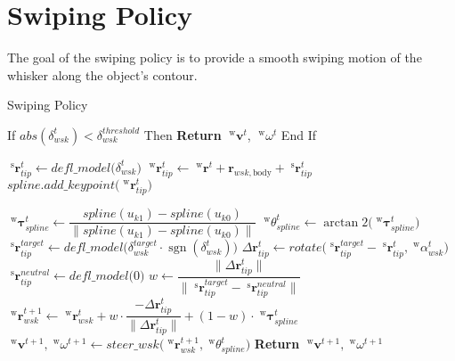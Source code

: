 \section{Swiping Policy}

The goal of the swiping policy is to provide a smooth swiping motion of the whisker along the object's contour.

\begin{algorithm}[htb]
    \caption{Swiping Policy}
    \begin{algorithmic}
        \State If \(abs(\delta_{wsk}^{t}) < \delta_{wsk}^{threshold}\)  Then
        \State \quad \textbf{Return} \(\;^{\mathrm{w}}\boldsymbol{v}^{t}\), \(\;^{\mathrm{w}}\omega^{t}\)
        \State End If

        \State \(\;^{\mathrm{s}}\boldsymbol{r}_{tip}^{t} \gets defl\_model\Big(\delta_{wsk}^{t}\Big)\)
        \State \(\;^{\mathrm{w}}\boldsymbol{r}_{tip}^{t} \gets \;^{\mathrm{w}}\boldsymbol{r}^{t} + \boldsymbol{r}_{wsk, \textrm{body}} + \;^{\mathrm{s}}\boldsymbol{r}_{tip}^{t}\)
        \State \(spline.add\_keypoint\big(\;^{\mathrm{w}}\boldsymbol{r}_{tip}^{t}\big)\) 

        \State \(\;^{\mathrm{w}}\boldsymbol{\tau}_{spline}^{t} \gets \dfrac{spline(u_{k1}) - spline(u_{k0})}{\|spline(u_{k1}) - spline(u_{k0})\|}\) 
        \State \(\;^{\mathrm{w}}\theta_{spline}^{t} \gets \arctan2\Big(\;^{\mathrm{w}}\boldsymbol{\tau}_{spline}^{t}\Big)\) 
        \State \(\;^{\mathrm{s}}\boldsymbol{r}_{tip}^{target} \gets defl\_model\Big(\delta_{wsk}^{target} \cdot \operatorname{sgn}(\delta_{wsk}^{t})\Big)\) 
        \State \(\Delta\boldsymbol{r}_{tip}^{t} \gets rotate\Big(\;^{\mathrm{s}}\boldsymbol{r}_{tip}^{target} - \;^{\mathrm{s}}\boldsymbol{r}_{tip}^{t},\; ^{\mathrm{w}}\alpha_{wsk}^{t}\Big)\) 
        \State \(\;^{\mathrm{s}}\boldsymbol{r}_{tip}^{neutral} \gets defl\_model\Big(0\Big)\) 
        \State \(w \gets \dfrac{\|\Delta\boldsymbol{r}_{tip}^{t}\|}{\|\;^{\mathrm{s}}\boldsymbol{r}_{tip}^{target} - \;^{\mathrm{s}}\boldsymbol{r}_{tip}^{neutral}\|}\) 
        \State \(\;^{\mathrm{w}}\boldsymbol{r}_{wsk}^{t+1} \gets \;^{\mathrm{w}}\boldsymbol{r}_{wsk}^{t} + w \cdot \dfrac{-\Delta\boldsymbol{r}_{tip}^{t}}{\|\Delta\boldsymbol{r}_{tip}^{t}\|} + (1 - w) \cdot \;^{\mathrm{w}}\boldsymbol{\tau}_{spline}^{t}\) 
        \State \(\;^{\mathrm{w}}\boldsymbol{v}^{t+1}, \;^{\mathrm{w}}\omega^{t+1} \gets steer\_wsk\big(\;^{\mathrm{w}}\boldsymbol{r}_{wsk}^{t+1},\;^{\mathrm{w}}\theta_{spline}^{t}\big)\)
        \State \textbf{Return} \(\;^{\mathrm{w}}\boldsymbol{v}^{t+1}, \;^{\mathrm{w}}\omega^{t+1}\)
    \end{algorithmic}
    \label{alg:swiping_policy}
\end{algorithm}

